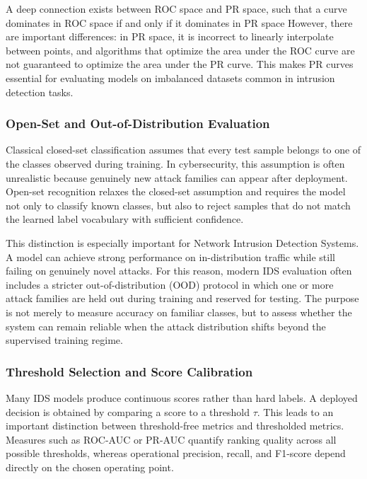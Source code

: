 \documentclass[12pt, a4paper]{report}
\begin{document}
A deep connection exists between ROC space and PR space, such that a curve dominates in ROC space if and only if it dominates in PR space  However, there are important differences: in PR space, it is incorrect to linearly interpolate between points, and algorithms that optimize the area under the ROC curve are not guaranteed to optimize the area under the PR curve. This makes PR curves essential for evaluating models on imbalanced datasets common in intrusion detection tasks.

\subsubsection{Open-Set and Out-of-Distribution Evaluation}
Classical closed-set classification assumes that every test sample belongs to one of the classes observed during training. In cybersecurity, this assumption is often unrealistic because genuinely new attack families can appear after deployment. Open-set recognition relaxes the closed-set assumption and requires the model not only to classify known classes, but also to reject samples that do not match the learned label vocabulary with sufficient confidence.

This distinction is especially important for Network Intrusion Detection Systems. A model can achieve strong performance on in-distribution traffic while still failing on genuinely novel attacks. For this reason, modern IDS evaluation often includes a stricter out-of-distribution (OOD) protocol in which one or more attack families are held out during training and reserved for testing. The purpose is not merely to measure accuracy on familiar classes, but to assess whether the system can remain reliable when the attack distribution shifts beyond the supervised training regime.

\subsubsection{Threshold Selection and Score Calibration}
Many IDS models produce continuous scores rather than hard labels. A deployed decision is obtained by comparing a score to a threshold $\tau$. This leads to an important distinction between threshold-free metrics and thresholded metrics. Measures such as ROC-AUC or PR-AUC quantify ranking quality across all possible thresholds, whereas operational precision, recall, and F1-score depend directly on the chosen operating point.
\end{document}
